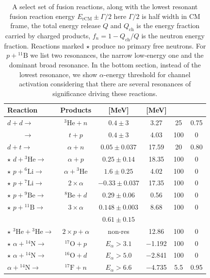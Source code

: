 \documentclass[particles,article,accept,pdftex,moreauthors]{Definitions/mdpi}
\begin{document}
\begin{table}[ht]
\centering
\caption{A select set of fusion reactions, along with the lowest resonant fusion reaction energy $E_\mathrm{rCM}\pm\Gamma/2$ here $\Gamma/2$ is half width in CM frame, the total energy release $Q$ and $Q_\mathrm{ch}$ is the energy fraction carried by charged products, $f_n = 1 - Q_\mathrm{ch}/Q$ is the neutron energy fraction. Reactions marked $\star$ produce no primary free neutrons. For $p+{}^{11}\mathrm{B}$ we list two resonances, the narrow low-energy one and the dominant broad resonance. In the bottom section, instead of the lowest resonance, we show $\alpha$-energy threshold for channel activation considering that there are several resonances of significance driving these reactions.}
\label{tab:aneutronic_reactions}
\begin{tabularx}{\linewidth}{lCcCCc}
\toprule
\textbf{Reaction} & \textbf{Products} &  \textbf{[MeV]} &  \textbf{[MeV]} &  &  \\
\midrule
\phantom{ $\star$ }$ d + d \to $ & ${}^{3}\mathrm{He}+n$ &$0.4\pm3$ &3.27 & 25 & 0.75 \\
\phantom{ $\star$ }$\phantom{d + d} \to $ & $t+p$ & $0.4\pm3$ &4.03 & 100 & 0 \\
\phantom{ $\star$ }$ d + t \to $ & $\alpha+n$ & $0.05\pm0.037$ &17.59 & 20 & 0.80 \\
\midrule
 $\star$ $d + {}^{3}\mathrm{He} \to $ & $\alpha+p$ & $0.25\pm0.14$ &18.35 & 100 & 0 \\
 $\star$ $p + {}^{6}\mathrm{Li} \to $ & $\alpha+ {}^{3}\mathrm{He}$ & $1.6\pm 0.25$ &4.02 & 100 & 0 \\
 $\star$ $p + {}^{7}\mathrm{Li} \to $ & $2\times\alpha$ &$ -0.33\pm0.037$ &17.35 & 100 & 0 \\
 $\star$ $p + {}^9\mathrm{Be} \to $ & ${}^{8}\mathrm{Be}+d$ & $0.29\pm 0.06$ & 0.56 & 100 & 0 \\
 $\star$ $p + {}^{11}\mathrm{B} \to $ & $3\times\alpha$ & $0.148\pm 0.003$ &8.68 & 100 & 0 \\
 \phantom{ $\star$ }$\phantom{p + {}^{11}\mathrm{B} \to}$ & \phantom{$3\times\alpha$} & $0.61\pm 0.15$ & & & \\
 $\star$ $ {}^{3}\mathrm{He} + {}^{3}\mathrm{He} \to $ & $2\times p+\alpha$ & non-res &12.86 & 100 & 0 \\
\midrule
 $\star$ $\alpha + {}^{14}\mathrm{N} \to $ & ${}^{17}\mathrm{O}+p$ & $E_\alpha>3.1$ & $-$1.192 & 100 & 0 \\
 $\star$ $\alpha + {}^{14}\mathrm{N} \to $ & ${}^{16}\mathrm{O}+d$ & $E_\alpha>5.0$ & $-$2.841 & 100 & 0 \\
 \phantom{$\star$} $\alpha + {}^{14}\mathrm{N} \to $ & ${}^{17}\mathrm{F}+n$ & $E_\alpha>6.6$ & $-$4.735 & 5.5 & 0.95 \\
\bottomrule
\end{tabularx}
\end{table}
\end{document}
